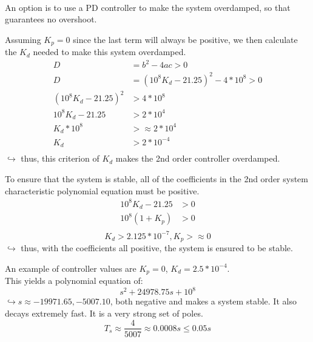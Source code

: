 \documentclass[12pt]{article}
\begin{document}
\

\begin{tcolorbox}[enhanced, frame hidden, colback=white, borderline west={1pt}{0pt}{gray}]
  An option is to use a PD controller to make the system overdamped, so that guarantees no overshoot.\\
  \begin{tcolorbox}[enhanced, frame hidden, colback=white, borderline west={1pt}{0pt}{gray}]
    Assuming $K_p = 0$ since the last term will always be positive, we then calculate the $K_d$ needed
    to make this system overdamped.
    \begin{align*}
      D &= b^2-4ac>0\\
      D &= (10^8 K_d -21.25)^2 -4*10^8 > 0\\
      (10^8 K_d -21.25)^2 &>4*10^8 \\
      10^8 K_d -21.25 &>2*10^4 \\
      K_d * 10^8 &> \approx 2*10^4\\
      K_d &> 2*10^{-4}\\
    \end{align*}
    $\hookrightarrow$ thus, this criterion of $K_d$ makes the 2nd order controller overdamped.
  \end{tcolorbox}
  
  \begin{tcolorbox}[enhanced, frame hidden, colback=white, borderline west={1pt}{0pt}{gray}]
    To ensure that the system is stable, all of the coefficients in the 2nd
    order system characteristic polynomial equation must be positive.
    \begin{align*}
      10^8K_d -21.25 &> 0\\
      10^8(1+K_p) &> 0\\
    \end{align*}
    \[K_d > 2.125 *10^{-7}, K_p >\approx 0\]
    $\hookrightarrow$ thus, with the coefficients all positive, the system is ensured to be stable.
  \end{tcolorbox}
  
  An example of controller values are $K_p = 0$, $K_d = 2.5*10^{-4}$.\\
  This yields a polynomial equation of:
  \[s^2 + 24978.75s+10^8\]
  $\hookrightarrow s \approx -19971.65, -5007.10$, both negative and makes a system stable. It also decays extremely fast. It is a very strong set of poles.
  \[T_s \approx \dfrac{4}{5007} \approx 0.0008s \leq 0.05s\]
\end{tcolorbox}
\end{document}
